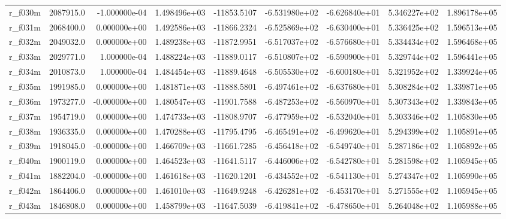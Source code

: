 \documentclass[12pt]{article}
\begin{document}
\begin{landscape}
\begin{longtable}{|l|r|r|r|r|r|r|r|r|}
r\_f030m                 &  2087915.0 & -1.000000e-04 &  1.498496e+03 & -11853.5107 & -6.531980e+02 & -6.626840e+01 &  5.346227e+02 &  1.896178e+05 \\
r\_f031m                 &  2068400.0 &  0.000000e+00 &  1.492586e+03 & -11866.2324 & -6.525869e+02 & -6.630400e+01 &  5.336425e+02 &  1.596513e+05 \\
r\_f032m                 &  2049032.0 &  0.000000e+00 &  1.489238e+03 & -11872.9951 & -6.517037e+02 & -6.576680e+01 &  5.334434e+02 &  1.596468e+05 \\
r\_f033m                 &  2029771.0 &  1.000000e-04 &  1.488224e+03 & -11889.0117 & -6.510807e+02 & -6.590900e+01 &  5.329744e+02 &  1.596441e+05 \\
r\_f034m                 &  2010873.0 &  1.000000e-04 &  1.484454e+03 & -11889.4648 & -6.505530e+02 & -6.600180e+01 &  5.321952e+02 &  1.339924e+05 \\
r\_f035m                 &  1991985.0 &  0.000000e+00 &  1.481871e+03 & -11888.5801 & -6.497461e+02 & -6.637680e+01 &  5.308284e+02 &  1.339871e+05 \\
r\_f036m                 &  1973277.0 & -0.000000e+00 &  1.480547e+03 & -11901.7588 & -6.487253e+02 & -6.560970e+01 &  5.307343e+02 &  1.339843e+05 \\
r\_f037m                 &  1954719.0 &  0.000000e+00 &  1.474733e+03 & -11808.9707 & -6.477959e+02 & -6.532040e+01 &  5.303346e+02 &  1.105830e+05 \\
r\_f038m                 &  1936335.0 &  0.000000e+00 &  1.470288e+03 & -11795.4795 & -6.465491e+02 & -6.499620e+01 &  5.294399e+02 &  1.105891e+05 \\
r\_f039m                 &  1918045.0 & -0.000000e+00 &  1.466709e+03 & -11661.7285 & -6.456418e+02 & -6.549740e+01 &  5.287186e+02 &  1.105892e+05 \\
r\_f040m                 &  1900119.0 &  0.000000e+00 &  1.464523e+03 & -11641.5117 & -6.446006e+02 & -6.542780e+01 &  5.281598e+02 &  1.105945e+05 \\
r\_f041m                 &  1882204.0 & -0.000000e+00 &  1.461618e+03 & -11620.1201 & -6.434552e+02 & -6.541130e+01 &  5.274347e+02 &  1.105990e+05 \\
r\_f042m                 &  1864406.0 &  0.000000e+00 &  1.461010e+03 & -11649.9248 & -6.426281e+02 & -6.453170e+01 &  5.271555e+02 &  1.105945e+05 \\
r\_f043m                 &  1846808.0 &  0.000000e+00 &  1.458799e+03 & -11647.5039 & -6.419841e+02 & -6.478650e+01 &  5.264048e+02 &  1.105988e+05 \\

\end{longtable}
\end{landscape}
\end{document}
